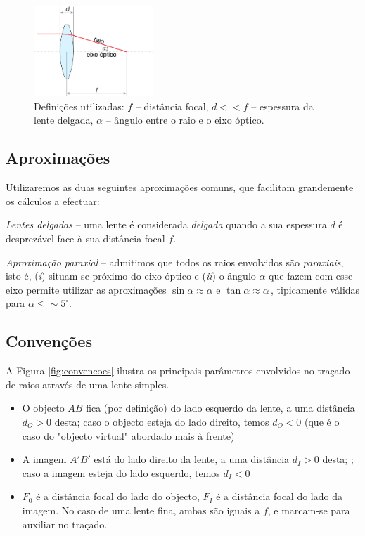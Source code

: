 \documentclass[a4paper,12pt]{article}      %
\begin{document}
\begin{figure}
	[!hb]  \centering 
	\includegraphics[width=0.4\textwidth]{2-definicoes}
 	\caption{\label{fig:fig2} Definições utilizadas: $f$ -- distância focal, $d<<f$ -- espessura da lente delgada, $\alpha$ -- ângulo entre o raio e o eixo óptico.} 
\end{figure}

\subsection{\sf Aproximações}
Utilizaremos as duas seguintes aproximações comuns, que facilitam grandemente os cálculos a efectuar:

\emph{Lentes delgadas} -- uma lente é considerada \emph{delgada} quando a sua espessura $d$ é desprezável face à sua distância focal $f$.

\emph{Aproximação paraxial} -- admitimos que todos os raios envolvidos são \emph{paraxiais}, isto é, (\emph{i}) situam-se próximo do eixo óptico e (\emph{ii}) o ângulo $\alpha$ que fazem com esse eixo permite utilizar as aproximações $\sin \alpha \approx \alpha$ e  $\tan \alpha \approx \alpha\,$, tipicamente válidas para $\alpha \leq \sim5^{\circ}$.


\subsection{\sf Convenções}
A Figura \ref{fig:convencoes} ilustra os principais parâmetros envolvidos no traçado de raios através de uma lente simples.

\begin{itemize}
\item O objecto $AB$ fica (por definição) do lado esquerdo da lente, a uma distância $d_O>0$ desta; caso o objecto esteja do lado direito, temos $d_O<0$ (que é o caso do "objecto virtual" abordado mais à frente)
\item A imagem $A'B'$ está do lado direito da lente, a uma distância $d_I>0$ desta; ; caso a imagem esteja do lado esquerdo, temos $d_I<0$
\item $F_0$ é a distância focal do lado do objecto, $F_I$ é a distância focal do lado da imagem. No caso de uma lente fina, ambas são iguais a $f$, e marcam-se para auxiliar no traçado.
\end{itemize}
\end{document}
